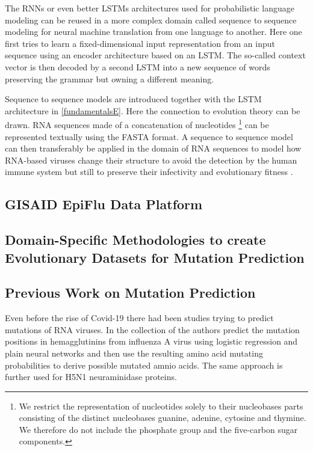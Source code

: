 The \acp{RNN} or even better \acp{LSTM} architectures used for probabilistic language modeling can be reused in a more complex domain called sequence to sequence modeling for neural machine translation from one language to another. Here one first tries to learn a fixed-dimensional input representation from an input sequence using an encoder architecture based on an \ac{LSTM}. The so-called context vector is then decoded by a second \ac{LSTM} into a new sequence of words preserving the grammar but owning a different meaning. \cite{Sutskever2014}

Sequence to sequence models are introduced together with the \ac{LSTM} architecture in \autoref{fundamentalsE}. Here the connection to evolution theory can be drawn. \ac{RNA} sequences made of a concatenation of nucleotides \footnote{We restrict the representation of nucleotides solely to their nucleobases parts consisting of the distinct nucleobases guanine, adenine, cytosine and thymine. We therefore do not include the phosphate group and the five-carbon sugar components.} can be represented textually using the FASTA format. A sequence to sequence model can then transferably be applied in the domain of \ac{RNA} sequences to model how \ac{RNA}-based viruses change their structure to avoid the detection by the human immune system but still to preserve their infectivity and evolutionary fitness \cite{Hie2021}. 

\subsection{GISAID EpiFlu Data Platform} \label{fundamentalsB}

\subsection{Domain-Specific Methodologies to create Evolutionary  Datasets for Mutation Prediction} \label{fundamentalsC}

\subsection{Previous Work on Mutation Prediction} \label{fundamentalsD}

Even before the rise of Covid-19 there had been studies trying to predict mutations of \ac{RNA} viruses. In the collection of \cite{Wu2007, Yan2007, Wu2008} the authors predict the mutation positions in hemagglutinins from influenza A virus using logistic regression and plain neural networks and then use the resulting amino acid mutating probabilities to derive possible mutated amnio acids. The same approach is further used for H5N1 neuraminidase proteins. 


